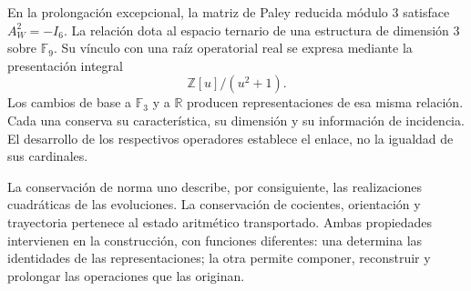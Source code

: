 En la prolongación excepcional, la matriz de Paley reducida módulo \(3\)
satisface \(A_W^2=-I_6\). La relación dota al espacio ternario de una
estructura de dimensión \(3\) sobre \(\mathbb F_9\). Su vínculo con una raíz
operatorial real se expresa mediante la presentación integral
\[
 \mathbb Z[u]/(u^2+1).
\]
Los cambios de base a \(\mathbb F_3\) y a \(\mathbb R\) producen
representaciones de esa misma relación. Cada una conserva su característica,
su dimensión y su información de incidencia. El desarrollo de los
respectivos operadores establece el enlace, no la igualdad de sus
cardinales.

La conservación de norma uno describe, por consiguiente, las realizaciones
cuadráticas de las evoluciones. La conservación de cocientes, orientación y
trayectoria pertenece al estado aritmético transportado. Ambas propiedades
intervienen en la construcción, con funciones diferentes: una determina las
identidades de las representaciones; la otra permite componer, reconstruir y
prolongar las operaciones que las originan.
